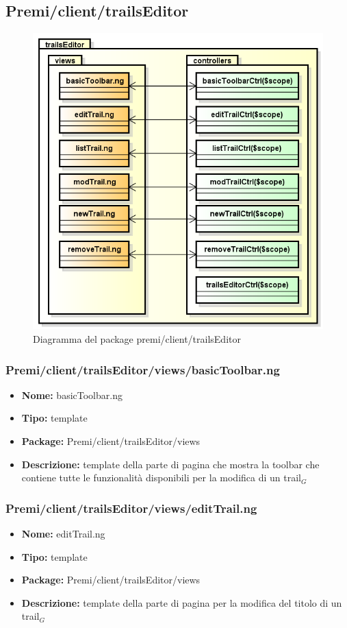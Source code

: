 \subsection{Premi/client/trailsEditor}
\begin{figure}[!h]
\begin{center}
\includegraphics[scale=0.45]{img/diapkg/trailsEditor.png}
\caption{Diagramma del package premi/client/trailsEditor}
\end{center}
\end{figure}
\subsubsection{Premi/client/trailsEditor/views/basicToolbar.ng}
\begin{itemize}
  \item[] \textbf{Nome:} basicToolbar.ng
  \item[] \textbf{Tipo:} template
  \item[] \textbf{Package:} Premi/client/trailsEditor/views
  \item[] \textbf{Descrizione:} template della parte di pagina che mostra la toolbar che contiene tutte le funzionalità disponibili per la modifica di un trail$_G$
\end{itemize}
\subsubsection{Premi/client/trailsEditor/views/editTrail.ng}
\begin{itemize}
  \item[] \textbf{Nome:} editTrail.ng
  \item[] \textbf{Tipo:} template
  \item[] \textbf{Package:} Premi/client/trailsEditor/views
  \item[] \textbf{Descrizione:}  template della parte di pagina per la modifica del titolo di un trail$_G$
\end{itemize}
